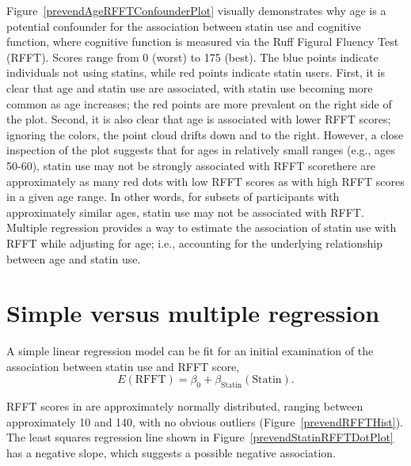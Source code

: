 Figure~\ref{prevendAgeRFFTConfounderPlot} visually demonstrates why age is a potential confounder for the association between statin use and cognitive function, where cognitive function is measured via the Ruff Figural Fluency Test (RFFT). Scores range from 0 (worst) to 175 (best). The blue points indicate individuals not using statins, while red points indicate statin users. First, it is clear that age and statin use are associated, with statin use becoming more common as age increases; the red points are more prevalent on the right side of the plot. Second, it is also clear that age is associated with lower RFFT scores; ignoring the colors, the point cloud drifts down and to the right. However, a close inspection of the plot suggests that for ages in relatively small ranges (e.g., ages 50-60), statin use may not be strongly associated with RFFT score\textemdash there are approximately as many red dots with low RFFT scores as with high RFFT scores in a given age range. In other words, for subsets of participants with approximately similar ages, statin use may not be associated with RFFT. Multiple regression provides a way to estimate the association of statin use with RFFT while adjusting for age; i.e., accounting for the underlying relationship between age and statin use.

\newpage

\section{Simple versus multiple regression}
\label{simpleVsMultipleRegression}

A simple linear regression model can be fit for an initial examination of the association between statin use and RFFT score,
\[
E(\text{RFFT}) = \beta_0 + \beta_{\text{Statin}}(\text{Statin}).
\label{RFFTStatinModel}
\]

RFFT scores in  are approximately normally distributed, ranging between approximately 10 and 140, with no obvious outliers (Figure~\ref{prevendRFFTHist}). The least squares regression line shown in Figure~\ref{prevendStatinRFFTDotPlot} has a negative slope, which suggests a possible negative association. 


